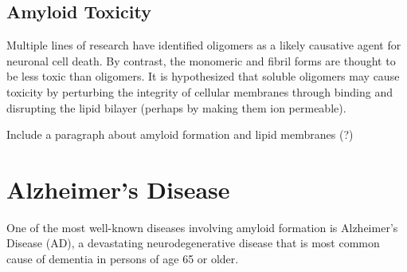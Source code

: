 \subsection{Amyloid Toxicity}
\begin{outline}
	\1 Multiple lines of research have identified oligomers as a likely causative agent for neuronal cell death. By contrast, the monomeric and fibril forms are thought to be less toxic than oligomers. It is hypothesized that soluble oligomers may cause toxicity by perturbing the integrity of cellular membranes through binding and disrupting the lipid bilayer (perhaps by making them ion permeable). \cite{Walsh:2007fu}

	\1 Include a paragraph about amyloid formation and lipid membranes (?)
\end{outline}


\section{Alzheimer's Disease}
One of the most well-known diseases involving amyloid formation is Alzheimer's Disease (AD), a devastating neurodegenerative disease that is most common cause of dementia in persons of age 65 or older.

